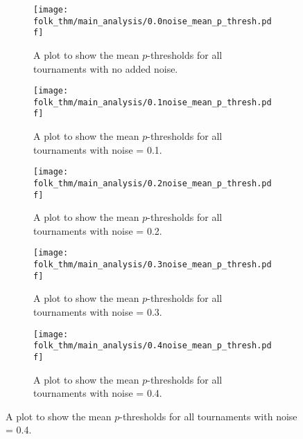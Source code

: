 \begin{figure}
    \begin{subfigure}{.45\textwidth}
        \centering
        \texttt{[image: folk\_thm/main\_analysis/0.0noise\_mean\_p\_thresh.pdf]}
        \caption{A plot to show the mean \(p\)-thresholds for all tournaments with no added noise.}\label{subfig:0.0noise_mean_p_thresh}
    \end{subfigure}
    \begin{subfigure}{.45\textwidth}
        \centering
        \texttt{[image: folk\_thm/main\_analysis/0.1noise\_mean\_p\_thresh.pdf]}
        \caption{A plot to show the mean \(p\)-thresholds for all tournaments with noise = 0.1.}\label{subfig:0.1noise_mean_p_thresh}
    \end{subfigure}
    

    \newline


    \begin{subfigure}{.3\textwidth}
        \centering
        \texttt{[image: folk\_thm/main\_analysis/0.2noise\_mean\_p\_thresh.pdf]}
        \caption{A plot to show the mean \(p\)-thresholds for all tournaments with noise = 0.2.}\label{subfig:0.2noise_mean_p_thresh}
    \end{subfigure}
    \begin{subfigure}{.3\textwidth}
        \centering
        \texttt{[image: folk\_thm/main\_analysis/0.3noise\_mean\_p\_thresh.pdf]}
        \caption{A plot to show the mean \(p\)-thresholds for all tournaments with noise = 0.3.}\label{subfig:0.3noise_mean_p_thresh}
    \end{subfigure}
    \begin{subfigure}{.3\textwidth}
        \centering
        \texttt{[image: folk\_thm/main\_analysis/0.4noise\_mean\_p\_thresh.pdf]}
        \caption{A plot to show the mean \(p\)-thresholds for all tournaments with noise = 0.4.}\label{subfig:0.4noise_mean_p_thresh}
    \end{subfigure}


    \newline



\end{figure}
